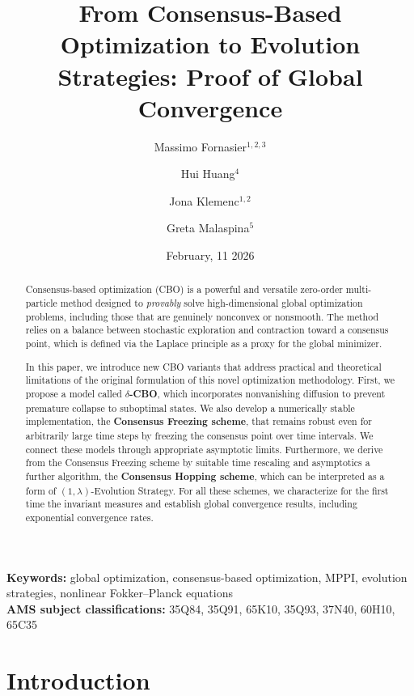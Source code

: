 \documentclass[reqno]{amsart}
\title[From Consensus-Based Optimization to Evolution Strategies]{From Consensus-Based Optimization to Evolution Strategies: Proof of Global Convergence}
\author{Massimo Fornasier$^{1, 2, 3}$}
\author{Hui Huang$^{4}$}
\author{Jona Klemenc$^{1,2}$}%
\author{Greta Malaspina$^{5}$}%
\date{February, 11 2026}
\numberwithin{algorithm}{section}
\begin{document}
\maketitle

 \begin{abstract}


Consensus-based optimization (CBO) is a powerful and versatile zero-order multi-particle method designed to \emph{provably} solve high-dimensional global optimization problems, including those that are genuinely nonconvex or nonsmooth. The method relies on a balance between stochastic exploration and contraction toward a consensus point, which is defined via the Laplace principle as a proxy for the global minimizer.

In this paper, we introduce new CBO variants that address practical and theoretical  limitations of the original formulation of this novel optimization methodology. First, we propose a model called {\bf \(\delta\)-CBO}, which incorporates nonvanishing diffusion to prevent premature collapse to suboptimal states. We also develop a numerically stable implementation, the \textbf{Consensus Freezing scheme}, that remains robust even for arbitrarily large time steps by freezing the consensus point over time intervals. We connect these models through appropriate asymptotic limits. Furthermore, we derive from the Consensus Freezing scheme by suitable time rescaling and asymptotics a  further  algorithm, the \textbf{Consensus Hopping scheme}, which can be interpreted as a form of \((1,\lambda)\)-Evolution Strategy. For all these schemes, we characterize for the first time the invariant measures and establish global convergence results, including exponential convergence rates.
\end{abstract}

{\noindent\small{\textbf{Keywords:} global optimization, 
    consensus-based optimization, MPPI, evolution strategies,
			nonlinear Fokker--Planck equations}}\\
	
	{\noindent\small{\textbf{AMS subject classifications:} 35Q84, 35Q91, 65K10, 35Q93, 37N40, 60H10, 65C35}}

\tableofcontents


\section{Introduction}
\end{document}

